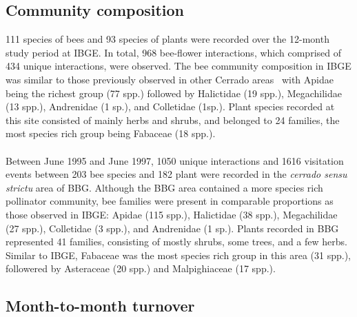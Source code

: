 \documentclass[11pt]{article}
\begin{document}
\subsection{Community composition}
111 species of bees and 93 species of plants were recorded over the 12-month study period at IBGE. In total, 968 bee-flower interactions, which comprised of 434 unique interactions, were observed. The bee community composition in IBGE was similar to those previously observed in other Cerrado areas~\citep{Silveira1995, Pinheiro-Machado2002} with Apidae being the richest group (77 spp.) followed by Halictidae (19 spp.), Megachilidae (13 spp.), Andrenidae (1 sp.), and Colletidae (1sp.). Plant species recorded at this site consisted of mainly herbs and shrubs, and belonged to 24 families, the most species rich group being Fabaceae (18 spp.). \\
\\
Between June 1995 and June 1997, 1050 unique interactions and 1616 visitation events between 203 bee species and 182 plant were recorded in the \textit{cerrado sensu strictu} area of BBG. Although the BBG area contained a more species rich pollinator community, bee families were present in comparable proportions as those observed in IBGE: Apidae (115 spp.), Halictidae (38 spp.), Megachilidae (27 spp.), Colletidae (3 spp.), and Andrenidae (1 sp.). Plants recorded in BBG represented 41 families, consisting of mostly shrubs, some trees, and a few herbs. Similar to IBGE, Fabaceae was the most species rich group in this area (31 spp.), followered by Asteraceae (20 spp.) and Malpighiaceae (17 spp.). 

\subsection{Month-to-month turnover}
\end{document}
